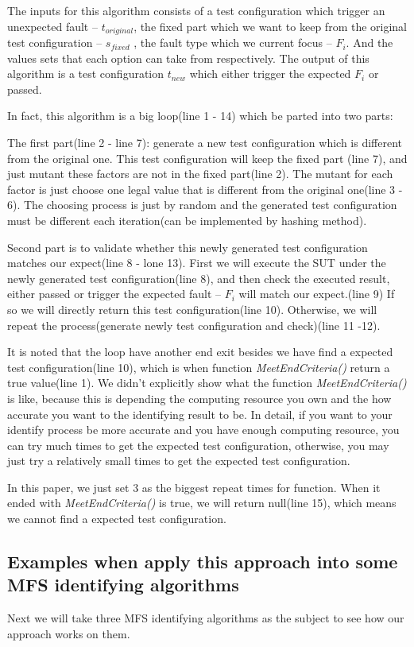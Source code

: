 \documentclass{sig-alternate}
\begin{document}
The inputs for this algorithm consists of a test configuration which trigger an unexpected fault -- $t_{original}$, the fixed part which we want to keep from the original test configuration -- $s_{fixed}$ , the fault type which we current focus -- $F_{i}$. And the values sets that each option can take from respectively.  The output of this algorithm is a test configuration $t_{new}$ which either trigger the expected $F_{i}$ or passed.

In fact, this algorithm is a big loop(line 1 - 14) which be parted into two parts:

The first part(line 2 - line 7): generate a new test configuration which is different from the original one. This test configuration will keep the fixed part (line 7), and just mutant these factors are not in the fixed part(line 2). The mutant for each factor is just choose one legal value that is different from the original one(line 3 - 6). The choosing process is just by random and the generated test configuration must be different each iteration(can be implemented by hashing method).

Second part is to validate whether this newly generated test configuration matches our expect(line 8 - lone 13). First we will execute the SUT under the newly generated test configuration(line 8), and then check the executed result, either passed or trigger the expected fault -- $F_{i}$ will match our expect.(line 9) If so we will directly return this test configuration(line 10). Otherwise, we will repeat the process(generate newly test configuration and check)(line 11 -12).

It is noted that the loop have another end exit besides we have find a expected test configuration(line 10), which is when function \emph{MeetEndCriteria()} return a true value(line 1). We didn't explicitly show what the function \emph{MeetEndCriteria()} is like, because this is depending the computing resource you own and the how accurate you want to the identifying result to be. In detail, if you want to your identify process be more accurate and you have enough computing resource, you can try much times to get the expected test configuration, otherwise, you may just try a relatively small times to get the expected test configuration.

In this paper, we just set 3 as the biggest repeat times for function. When it ended with \emph{MeetEndCriteria()} is true, we will return null(line 15), which means we cannot find a expected test configuration.

\subsection{Examples when apply this approach into some MFS identifying algorithms}
Next we will take three MFS identifying algorithms as the subject to see how our approach works on them.
\end{document}
